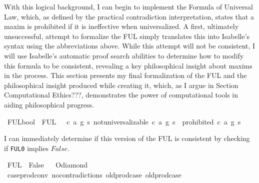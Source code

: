 \begin{isabellebody}
\begin{isamarkuptext}
With this logical background, I can begin to implement the Formula of Universal Law, which, as defined 
by the practical contradiction interpretation, states that a maxim is prohibited if it is ineffective
when universalized. A first, ultimately unsuccessful, attempt to formalize the FUL simply translates this into Isabelle's syntax
using the abbreviations above. While this attempt will not be consistent, I will use Isabelle's automatic
proof search abilities to determine how to modify this formula to be consistent, revealing a key philosophical
insight about maxims in the process. This section presents my final formalization of the FUL and the 
philosophical insight produced while creating it, which, as I argue in Section Computational Ethics???,
demonstrates the power of computational tools in aiding philosophical progress.%
\end{isamarkuptext}\isamarkuptrue%
\isamarkupfalse%
\ FUL{}{\isacharcolon}{\isacharcolon}bool\ \ {\isachardoublequoteopen}FUL{}\ {\isasymequiv}\ {\isasymforall}\ c\ a\ g\ s{\isachardot}\ not{\isacharunderscore}universalizable\ {\isacharparenleft}c{\isacharcomma}\ a{\isacharcomma}\ g{\isacharparenright}\ s\ {\isasymlongrightarrow}\ {\isasymTurnstile}{\isacharparenleft}{\isacharparenleft}prohibited\ {\isacharparenleft}c{\isacharcomma}\ a{\isacharcomma}\ g{\isacharparenright}\ s{\isacharparenright}{\isacharparenright}{\isachardoublequoteclose}\isanewline
%
%
\begin{isamarkuptext}%
I can immediately determine if this version of the FUL is consistent by checking if \texttt{FUL0} 
implies $False$.%
\end{isamarkuptext}\isamarkuptrue%
\isamarkupfalse%
\ {\isachardoublequoteopen}FUL{}\ {\isasymlongrightarrow}\ False{\isachardoublequoteclose}%
\isadelimproof
\ %
\endisadelimproof
%
\isatagproof
{}\isamarkupfalse%
\ O{\isacharunderscore}diamond\isanewline
\ \ \isamarkupfalse%
\ case{\isacharunderscore}prod{\isacharunderscore}conv\ no{\isacharunderscore}contradictions\ old{\isachardot}prod{\isachardot}case\ old{\isachardot}prod{\isachardot}case\ \isamarkupfalse%

\end{isabellebody}
